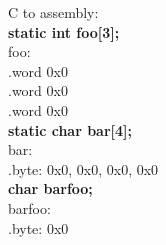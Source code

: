 \documentclass{article}
\begin{document}
\noindent C to assembly:\\
\textbf{static int foo[3];}\\
foo:\\
.word  0x0 \\
.word  0x0 \\
.word  0x0 \\
\vskip 1cm
\noindent\textbf{static char bar[4];}\\
bar:\\
.byte: 0x0, 0x0, 0x0, 0x0\\
\vskip 1cm
\noindent\textbf{char barfoo;}\\
barfoo:\\
.byte: 0x0\\
\end{document}
